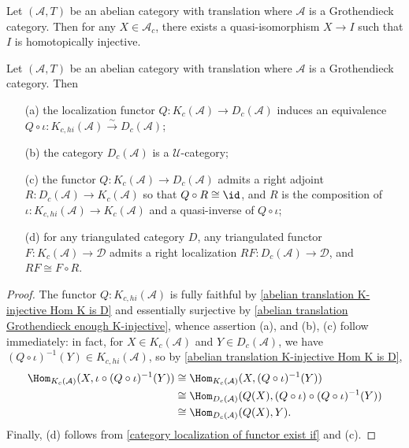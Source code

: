 \begin{corollary}\label{abelian translation Grothendieck enough K-injective}
Let $(\mathcal{A},T)$ be an abelian category with translation where $\mathcal{A}$ is a Grothendieck category. Then for any $X\in\mathcal{A}_c$, there exists a quasi-isomorphism $X\to I$ such that $I$ is homotopically injective.
\end{corollary}

\begin{corollary}\label{abelian translation Grothendieck derived cat prop}
Let $(\mathcal{A},T)$ be an abelian category with translation where $\mathcal{A}$ is a Grothendieck category. Then
\begin{enumerate}
    \item[(a)] the localization functor $Q:K_c(\mathcal{A})\to D_c(\mathcal{A})$ induces an equivalence $Q\circ\iota:K_{c,hi}(\mathcal{A})\stackrel{\sim}{\to} D_c(\mathcal{A})$;
    \item[(b)] the category $D_c(\mathcal{A})$ is a $\mathscr{U}$-category;
    \item[(c)] the functor $Q:K_c(\mathcal{A})\to D_c(\mathcal{A})$ admits a right adjoint $R:D_c(\mathcal{A})\to K_c(\mathcal{A})$ so that $Q\circ R\cong\id$, and $R$ is the composition of $\iota:K_{c,hi}(\mathcal{A})\to K_c(\mathcal{A})$ and a quasi-inverse of $Q\circ\iota$;
    \item[(d)] for any triangulated category $D$, any triangulated functor $F:K_c(\mathcal{A})\to\mathcal{D}$ admits a right localization $RF:D_c(\mathcal{A})\to\mathcal{D}$, and $RF\cong F\circ R$.
\end{enumerate}
\end{corollary}
\begin{proof}
The functor $Q:K_{c,hi}(\mathcal{A})$ is fully faithful by \cref{abelian translation K-injective Hom K is D} and essentially surjective by \cref{abelian translation Grothendieck enough K-injective}, whence assertion (a), and (b), (c) follow immediately: in fact, for $X\in K_c(\mathcal{A})$ and $Y\in D_c(\mathcal{A})$, we have $(Q\circ\iota)^{-1}(Y)\in K_{c,hi}(\mathcal{A})$, so by \cref{abelian translation K-injective Hom K is D},
\begin{align*}
\Hom_{K_c(\mathcal{A})}(X,\iota\circ(Q\circ\iota)^{-1}(Y))&\cong \Hom_{K_c(\mathcal{A})}(X,(Q\circ\iota)^{-1}(Y))\\
&\cong \Hom_{D_c(\mathcal{A})}(Q(X),(Q\circ\iota)\circ(Q\circ\iota)^{-1}(Y))\\
&\cong\Hom_{D_c(\mathcal{A})}(Q(X),Y).
\end{align*}
Finally, (d) follows from \cref{category localization of functor exist if} and (c).
\end{proof}

